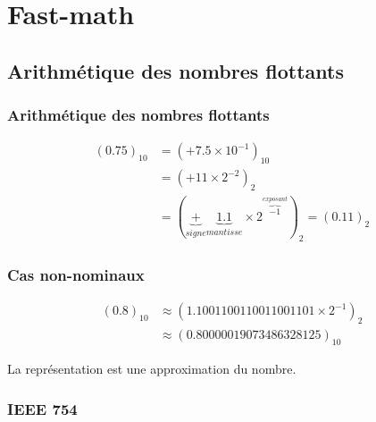 \documentclass{beamer}
\begin{document}
\section{Fast-math}

\begin{frame}
    \tableofcontents[currentsection]
\end{frame}

\subsection{Arithmétique des nombres flottants}

\begin{frame}
    \frametitle{Arithmétique des nombres flottants}

    \begin{displaymath}
        \begin{split}
            (0.75)_{10} & = (+ 7.5 \times 10^{-1})_{10} \\
            & = (+11 \times 2^{-2})_{2} \\
            & = (\underbrace{+}_{signe} \underbrace{1.1}_{mantisse} \times 2^{\overbrace{-1}^{exposant}})_{2} = (0.11)_{2}
        \end{split}
    \end{displaymath}
\end{frame}

\begin{frame}
    \frametitle{Cas non-nominaux}

    \begin{displaymath}
        \begin{split}
            (0.8)_{10} & \approx (1.1001100110011001101 \times 2^{-1})_{2} \\
            & \approx (0.80000019073486328125)_{10}
        \end{split}
    \end{displaymath}

    La représentation est une approximation du nombre.
\end{frame}

\subsubsection{IEEE 754}
\end{document}

